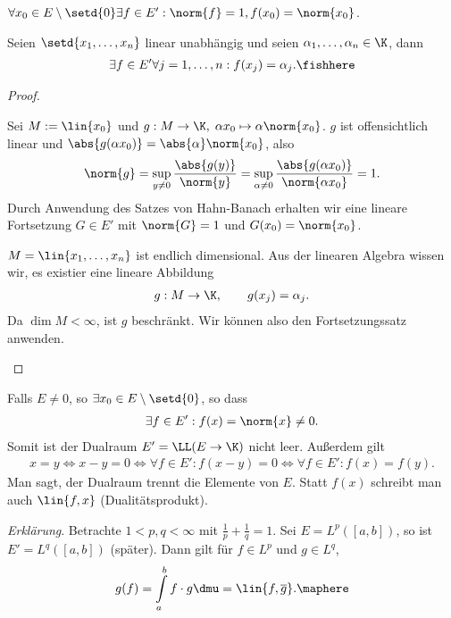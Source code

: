 \begin{cor}
\label{prop:4.13}
\begin{propenum}
  \item $\forall x_0\in E\setminus\setd{0} \exists f \in E' : \norm{f} = 1,
  f(x_0) = \norm{x_0}$.
  \item Seien $\setd{x_1,\ldots,x_n}$ linear unabhängig und seien
  $\alpha_1,\ldots,\alpha_n\in \K$, dann
\begin{align*}
\exists f\in E' \forall j=1,\ldots,n : f(x_j) = \alpha_j.\fishhere
\end{align*}
\end{propenum}
\end{cor}
\begin{proof}
\begin{proofenum}
  \item 
Sei $M:=\lin{x_0}$ und $g: M\to \K,\; \alpha x_0\mapsto \alpha\norm{x_0}$. $g$
ist offensichtlich linear und $\abs{g(\alpha x_0)} = \abs{\alpha}\norm{x_0}$,
also
\begin{align*}
\norm{g} = \sup\limits_{y\neq 0}\frac{\abs{g(y)}}{\norm{y}}
= \sup\limits_{\alpha\neq 0}\frac{\abs{g(\alpha x_0)}}{\norm{\alpha x_0}} = 1.
\end{align*}
Durch Anwendung des Satzes von Hahn-Banach erhalten wir eine lineare
Fortsetzung $G\in E'$ mit $\norm{G}=1$ und $G(x_0) = \norm{x_0}$.
\item $M=\lin{x_1,\ldots,x_n}$ ist endlich dimensional. Aus der linearen
Algebra wissen wir, es existier eine lineare Abbildung
\begin{align*}
g : M \to \K,\qquad g(x_j) = \alpha_j.
\end{align*}
Da $\dim M <\infty$, ist $g$ beschränkt. Wir können also den Fortsetzungssatz
anwenden.\qedhere
\end{proofenum}
\end{proof}

\begin{bem}[Diskussion.]
\label{bem:4.14}
Falls $E\neq 0$, so $\exists x_0\in E\setminus\setd{0}$, so dass
\begin{align*}
\exists f\in E' : f(x) = \norm{x}\neq 0.
\end{align*}
Somit ist der Dualraum $E'=\LL(E\to\K)$ nicht leer. Außerdem gilt
\begin{align*}
x=y \Leftrightarrow x-y=0 \Leftrightarrow \forall f\in E' : f(x-y) =0
\Leftrightarrow \forall f\in E' : f(x) = f(y).
\end{align*}
Man sagt, der Dualraum trennt die Elemente von $E$. Statt $f(x)$ schreibt man
auch $\lin{f,x}$ (Dualitätsprodukt).

\textit{Erklärung}. Betrachte $1< p,q < \infty$ mit
$\frac{1}{p}+\frac{1}{q}=1$.
Sei $E=L^p([a,b])$, so ist $E'=L^q([a,b])$
(später). Dann gilt für $f\in L^p$ und $g\in L^q$,
\begin{align*}
g(f) = \int\limits_a^b f\cdot g \dmu = \lin{f,\overline{g}}.\maphere
\end{align*}
\end{bem}

